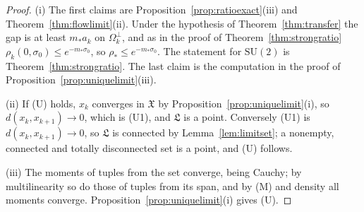 \documentclass[aps,prd,twocolumn,superscriptaddress,nofootinbib,longbibliography,floatfix,amsmath,amssymb,10pt]{revtex4-2}
\theoremstyle{definition}
\theoremstyle{remark}
\newcommand{\SU}{\mathrm{SU}}
\begin{document}
\begin{proof}
(i) The first claims are Proposition~\ref{prop:ratioexact}(iii) and
Theorem~\ref{thm:flowlimit}(ii). Under the hypothesis of
Theorem~\ref{thm:transfer} the gap is at least $m_*a_k$ on
$\Omega_k^\perp$, and as in the proof of Theorem~\ref{thm:strongratio}
$\rho_k(0,\sigma_0)\le e^{-m_*\sigma_0}$, so $\rho_*\le e^{-m_*\sigma_0}$.
The statement for $\SU(2)$ is Theorem~\ref{thm:strongratio}. The last
claim is the computation in the proof of
Proposition~\ref{prop:uniquelimit}(iii).

(ii) If (U) holds, $x_k$ converges in $\mathfrak X$ by
Proposition~\ref{prop:uniquelimit}(i), so $d(x_k,x_{k+1})\to0$, which is
(U1), and $\mathfrak L$ is a point. Conversely (U1) is $d(x_k,x_{k+1})\to
0$, so $\mathfrak L$ is connected by Lemma~\ref{lem:limitset}; a
nonempty, connected and totally disconnected set is a point, and (U)
follows.

(iii) The moments of tuples from the set converge, being Cauchy; by
multilinearity so do those of tuples from its span, and by (M) and density
all moments converge. Proposition~\ref{prop:uniquelimit}(i) gives (U).


\end{proof}
\end{document}
